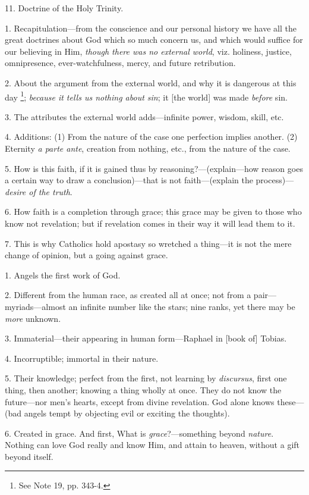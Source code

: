 11. Doctrine of the Holy Trinity.


1. Recapitulation—from the conscience and our
personal history we have all the great doctrines about God which so
much concern us, and which would suffice for our believing in Him, \emph{though
there was no external world}, viz. holiness, justice, omnipresence,
ever-watchfulness, mercy, and future retribution.

2. About the argument from the external world,
and why it is dangerous at this day \footnote{See Note
19, pp. 343-4.}; \emph{because it tells us nothing about sin}; it [the world]
was made \emph{before} sin.

3. The attributes the external world
adds—infinite power, wisdom, skill, etc.

4. Additions: (1) From the nature of the case one
perfection implies another. (2) Eternity \emph{a parte ante}, creation
from nothing, etc., from the nature of the case.

5. How is this faith, if it is gained thus by
reasoning?—(explain—how reason goes a certain way to draw a
conclusion)—that is not faith—(explain the process)—\emph{desire of
the truth}.

6. How faith is a completion through grace; this
grace may be given to those who know not revelation; but if revelation
comes in their way it will lead them to it.

7. This is why Catholics hold apostasy so
wretched a thing—it is not the mere change of opinion, but a going
against grace.


1. Angels the first work of God.

2. Different from the human race, as created all
at once; not from a pair—myriads—almost an infinite number like
the stars; nine ranks, yet there may be \emph{more} unknown.

3. Immaterial—their appearing in human
form—Raphael in [book of] Tobias.

4. Incorruptible; immortal in their nature.

5. Their knowledge; perfect from the first, not
learning by \emph{discursus}, first one thing, then another; knowing a
thing wholly at once. They do not know the future—nor men's hearts,
except from divine revelation. God alone knows these—(bad angels
tempt by objecting evil or exciting the thoughts).

6. Created in grace. And first, What is \emph{grace}?—something
beyond \emph{nature}. Nothing can love God really and know Him,
and attain to heaven, without a gift beyond itself.

